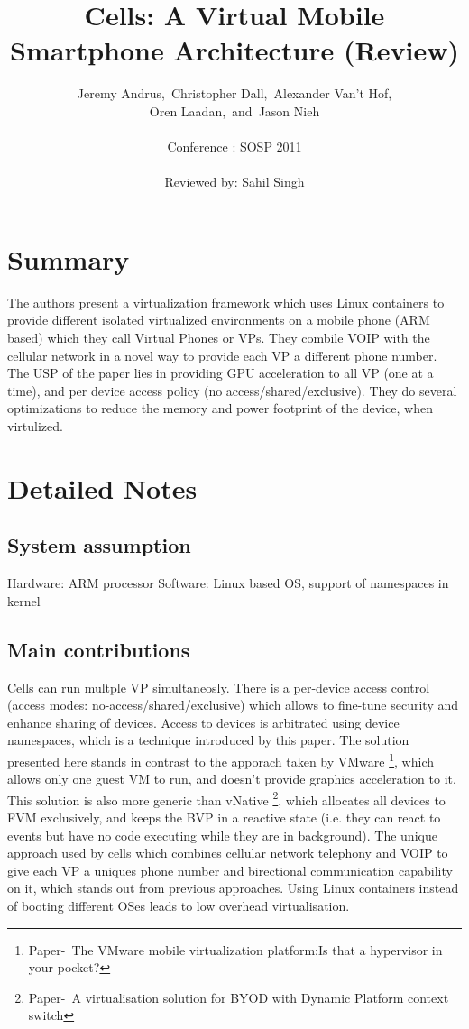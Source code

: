 \documentclass[a4paper,10pt]{article}
\title{Cells: A Virtual Mobile Smartphone Architecture (Review) }
\author{Jeremy Andrus,\	Christopher Dall,\ Alexander Van't Hof,\\ Oren Laadan,\ and\ Jason Nieh\\\\ Conference : SOSP 2011\\\\Reviewed by: Sahil Singh}
\date{}
\begin{document}
\maketitle
\section*{Summary}
The authors present a virtualization framework which uses Linux containers to provide different isolated virtualized environments on a mobile phone (ARM based) which they call
Virtual Phones or VPs. They combile VOIP with the cellular network in a novel way to provide each VP a different phone number. The USP of the paper lies in providing GPU acceleration to all VP (one at a time), and per device access policy (no access/shared/exclusive).
They do several optimizations to reduce the memory and power footprint of the device, when virtulized.

\section*{Detailed Notes}
\subsection*{System assumption}
Hardware: ARM processor
Software: Linux based OS, support of namespaces in kernel
\subsection*{Main contributions}
Cells can run multple VP simultaneosly. There is a per-device access control (access modes: no-access/shared/exclusive) which allows to fine-tune security and enhance sharing of devices.
Access to devices is arbitrated using device namespaces, which is a technique introduced by this paper.
The solution presented here stands in contrast to the apporach taken by VMware \footnote{Paper-\ The VMware mobile virtualization platform:Is that a hypervisor in your pocket?}, which allows only one guest VM to run, and doesn't provide graphics acceleration to it.
This solution is also more generic than vNative \footnote{Paper-\ A virtualisation solution for BYOD with Dynamic Platform context switch}, which allocates all devices to FVM exclusively, and keeps the BVP in a reactive state (i.e. they can react to events but have no code executing while they are in background).
The unique approach used by cells which combines cellular network telephony and VOIP to give each VP a uniques phone number and birectional communication capability on it, which stands out from previous approaches.
Using Linux containers instead of booting different OSes leads to low overhead virtualisation.
\end{document}
